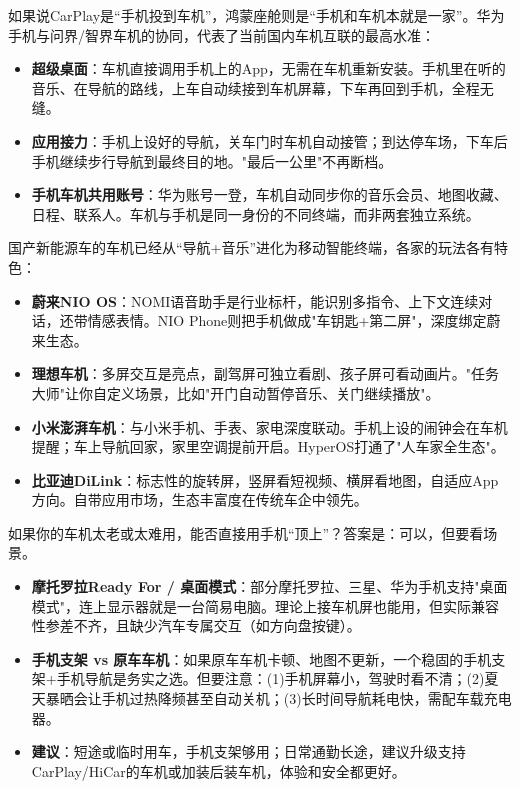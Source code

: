 如果说CarPlay是“手机投到车机”，鸿蒙座舱则是“手机和车机本就是一家”。华为手机与问界/智界车机的协同，代表了当前国内车机互联的最高水准：

\begin{itemize}
  \item \textbf{超级桌面}：车机直接调用手机上的App，无需在车机重新安装。手机里在听的音乐、在导航的路线，上车自动续接到车机屏幕，下车再回到手机，全程无缝。
  \item \textbf{应用接力}：手机上设好的导航，关车门时车机自动接管；到达停车场，下车后手机继续步行导航到最终目的地。"最后一公里"不再断档。
  \item \textbf{手机车机共用账号}：华为账号一登，车机自动同步你的音乐会员、地图收藏、日程、联系人。车机与手机是同一身份的不同终端，而非两套独立系统。
\end{itemize}


国产新能源车的车机已经从“导航+音乐”进化为移动智能终端，各家的玩法各有特色：

\begin{itemize}
  \item \textbf{蔚来NIO OS}：NOMI语音助手是行业标杆，能识别多指令、上下文连续对话，还带情感表情。NIO Phone则把手机做成"车钥匙+第二屏"，深度绑定蔚来生态。
  \item \textbf{理想车机}：多屏交互是亮点，副驾屏可独立看剧、孩子屏可看动画片。"任务大师"让你自定义场景，比如"开门自动暂停音乐、关门继续播放"。
  \item \textbf{小米澎湃车机}：与小米手机、手表、家电深度联动。手机上设的闹钟会在车机提醒；车上导航回家，家里空调提前开启。HyperOS打通了"人车家全生态"。
  \item \textbf{比亚迪DiLink}：标志性的旋转屏，竖屏看短视频、横屏看地图，自适应App方向。自带应用市场，生态丰富度在传统车企中领先。
\end{itemize}


如果你的车机太老或太难用，能否直接用手机“顶上”？答案是：可以，但要看场景。

\begin{itemize}
  \item \textbf{摩托罗拉Ready For / 桌面模式}：部分摩托罗拉、三星、华为手机支持"桌面模式"，连上显示器就是一台简易电脑。理论上接车机屏也能用，但实际兼容性参差不齐，且缺少汽车专属交互（如方向盘按键）。
  \item \textbf{手机支架 vs 原车车机}：如果原车车机卡顿、地图不更新，一个稳固的手机支架+手机导航是务实之选。但要注意：(1)手机屏幕小，驾驶时看不清；(2)夏天暴晒会让手机过热降频甚至自动关机；(3)长时间导航耗电快，需配车载充电器。
  \item \textbf{建议}：短途或临时用车，手机支架够用；日常通勤长途，建议升级支持CarPlay/HiCar的车机或加装后装车机，体验和安全都更好。
\end{itemize}

